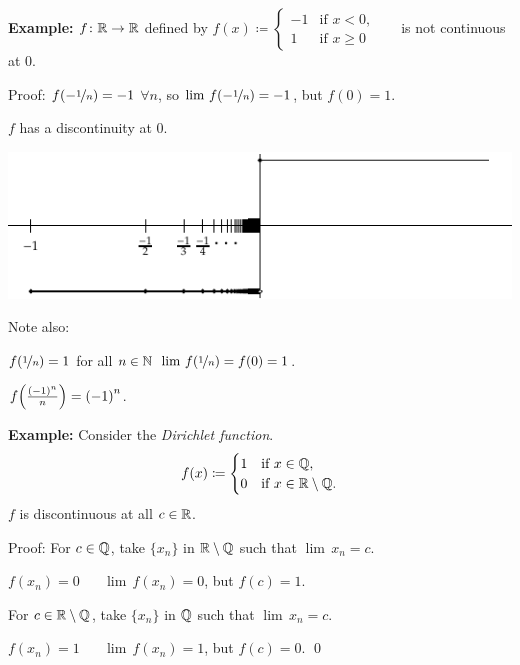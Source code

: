 \documentclass[10pt,aspectratio=149]{beamer}
\begin{document}
\begin{frame}

\textbf{Example:}
$f \colon {\mathbb{R}} \to {\mathbb{R}}$ defined by
$f(x) \coloneqq 
\begin{cases}
-1 & \text{if } x < 0, \\
1 & \text{if } x \geq 0
\end{cases}$
~~ is not continuous at 0.

\pause
\medskip

Proof: $f(-\nicefrac{1}{n}) = -1$ $\forall n$, so
$\lim\, f(-\nicefrac{1}{n}) = -1$, but $f(0) = 1$.

\pause
\thus \quad $f$ has a discontinuity at $0$.

\pause
\medskip

\begin{center}
\includegraphics{../figures/jumpdiscont}
\end{center}

\pause
\medskip

Note also:

\medskip

$f(\nicefrac{1}{n}) = 1$ for all $n \in {\mathbb{N}}$ \wthus $\lim \, f(\nicefrac{1}{n}) = f(0) = 1$.

\pause
\medskip

$f\Bigl(\frac{{(-1)}^n}{n}\Bigr) = {(-1)}^n$.
\end{frame}

\begin{frame}

\textbf{Example:}
Consider the \emph{Dirichlet function}.
\begin{equation*}
f(x) \coloneqq
\begin{cases}
1 & \text{if } x \in {\mathbb{Q}} , \\
0 & \text{if } x \in {\mathbb{R}} \setminus {\mathbb{Q}} .
\end{cases}
\end{equation*}
\pause
$f$ is discontinuous at all $c \in {\mathbb{R}}$.

\pause
\medskip

Proof:
For $c \in {\mathbb{Q}}$, take $\{ x_n \}$ in ${\mathbb{R}} \setminus {\mathbb{Q}}$ such that $\lim\, x_n = c$.

\pause
$f(x_n) = 0$ ~\thus~ $\lim\, f(x_n) = 0$,
\quad but $f(c) = 1$.

\pause
\medskip

For $c \in {\mathbb{R}} \setminus {\mathbb{Q}}$, take $\{ x_n \}$ in ${\mathbb{Q}}$ such that $\lim\, x_n = c$.

\pause
$f(x_n) = 1$ ~\thus~ $\lim\, f(x_n) = 1$,
\quad but $f(c) = 0$.
\qed

\end{frame}
\end{document}
